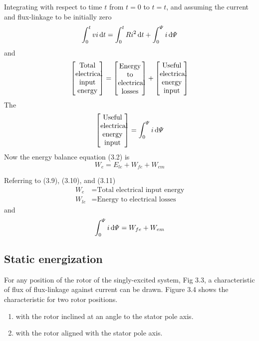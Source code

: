 \documentclass[a4paper,numbers=noenddot,12pt]{scrbook}
\begin{document}
Integrating with respect to time $t$ from $t = 0$ to $t = t$, and assuming the current and flux-linkage to be initially zero
\begin{equation}
    \int_0^t vi \dif t = \int_0^t Ri^2 \dif t + \int_0^{\varPsi} i \dif \varPsi
    \label{eq:Eq3.9}
\end{equation}
and
\begin{equation}
    \left[
        \parbox{8ex}{\centering Total \\ electrical \\ input \\ energy}
    \right]
    =
    \left[
        \parbox{8ex}{\centering Energy \\ to \\ electrical \\ losses}
    \right]
    +
    \left[
        \parbox{8ex}{\centering Useful \\ electrical \\ energy \\ input}
    \right]
    \label{eq:Eq3.10}
\end{equation}
The
\begin{equation}
    \left[
        \parbox{8ex}{\centering Useful \\ electrical \\ energy \\ input}
    \right]
    =
    \int_0^{\varPsi} i \dif \varPsi
    \label{eq:Eq3.11}
\end{equation}
Now the energy balance equation (3.2) is
\begin{equation*}
    W_e = E_{le} + W_{fe} + W_{em}
\end{equation*}

Referring to (3.9), (3.10), and (3.11)
\begin{align*}
    W_e & = \text{Total electrical input energy}\\
    W_{le} & = \text{Energy to electrical losses}
\end{align*}
and
\begin{equation}
    \int_0^{\varPsi} i \dif \varPsi = W_{fe} + W_{em}
    \label{eq:Eq3.12}
\end{equation}

\subsection{Static energization}
For any position of the rotor of the singly-excited system, Fig 3.3, a characteristic of flux of flux-linkage against current can be drawn. Figure 3.4 shows the characteristic for two rotor positions.
\begin{enumerate}[label={Position \Alph*:},leftmargin=3cm]
    \item with the rotor inclined at an angle to the stator pole axis.
    \item with the rotor aligned with the stator pole axis.
\end{enumerate}
\end{document}
